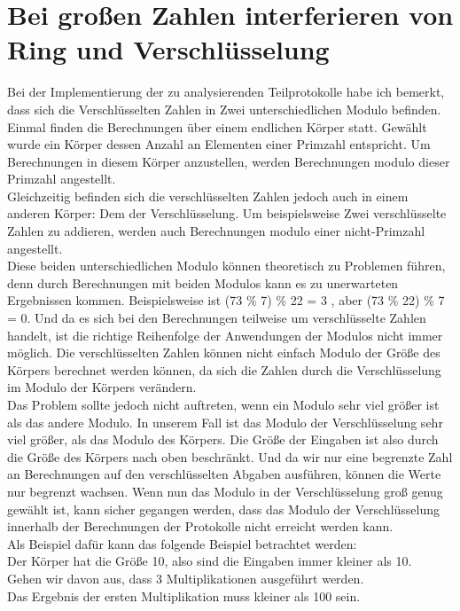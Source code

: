 \section{Bei großen Zahlen interferieren von Ring und Verschlüsselung}
Bei der Implementierung der zu analysierenden Teilprotokolle habe ich bemerkt, dass sich die Verschlüsselten Zahlen in Zwei unterschiedlichen Modulo befinden. Einmal finden die Berechnungen über einem endlichen Körper statt. Gewählt wurde ein Körper dessen Anzahl an Elementen einer Primzahl entspricht. Um Berechnungen in diesem Körper anzustellen, werden Berechnungen modulo dieser Primzahl angestellt.\\
Gleichzeitig befinden sich die verschlüsselten Zahlen jedoch auch in einem anderen Körper: Dem der Verschlüsselung. Um beispielsweise Zwei verschlüsselte Zahlen zu addieren, werden auch Berechnungen modulo einer nicht-Primzahl angestellt.\\
Diese beiden unterschiedlichen Modulo können theoretisch zu Problemen führen, denn durch Berechnungen mit beiden Modulos kann es zu unerwarteten Ergebnissen kommen.
Beispielsweise ist (73 \% 7) \% 22  = 3 , aber (73 \% 22) \% 7 = 0. Und da es sich bei den Berechnungen teilweise um verschlüsselte Zahlen handelt, ist die richtige Reihenfolge der Anwendungen der Modulos nicht immer möglich. Die verschlüsselten Zahlen können nicht einfach Modulo der Größe des Körpers berechnet werden können, da sich die Zahlen durch die Verschlüsselung im Modulo der Körpers verändern.\\
Das Problem sollte jedoch nicht auftreten, wenn ein Modulo sehr viel größer ist als das andere Modulo. In unserem Fall ist das Modulo der Verschlüsselung sehr viel größer, als das Modulo des Körpers. Die Größe der Eingaben ist also durch die Größe des Körpers nach oben beschränkt. Und da wir nur eine begrenzte Zahl an Berechnungen auf den verschlüsselten Abgaben ausführen, können die Werte nur begrenzt wachsen. Wenn nun das Modulo in der Verschlüsselung groß genug gewählt ist, kann sicher gegangen werden, dass das Modulo der Verschlüsselung innerhalb der Berechnungen der Protokolle nicht erreicht werden kann.\\
Als Beispiel dafür kann das folgende Beispiel betrachtet werden:\\
Der Körper hat die Größe 10, also sind die Eingaben immer kleiner als 10.\\
Gehen wir davon aus, dass 3 Multiplikationen ausgeführt werden.\\
Das Ergebnis der ersten Multiplikation muss kleiner als 100 sein.\\
